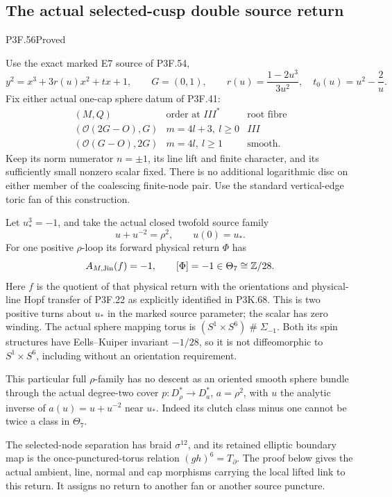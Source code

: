\subsection{The actual selected-cusp double source return}
\begin{statement}{P3F.56}{Proved}

Use the exact marked E7 source of P3F.54,
\[
 y^2=x^3+3r(u)x^2+t x+1,\qquad G=(0,1),\qquad
 r(u)=\frac{1-2u^3}{3u^2},\quad t_0(u)=u^2-\frac2u.
\]
Fix either actual one-cap sphere datum of P3F.41:
\[
 \begin{array}{c|c|c}
 (M,Q)&\text{order at }III^*&\text{root fibre}\\ \hline
 (\mathcal O(2G-O),G)&m=4l+3,\ l\ge0&III\\
 (\mathcal O(G-O),2G)&m=4l,\ l\ge1&\text{smooth}.
 \end{array}
\]
Keep its norm numerator \(n=\pm1\), its line lift and finite character,
and its sufficiently small nonzero scalar fixed. There is no additional
logarithmic disc on either member of the coalescing finite-node pair.
Use the standard vertical-edge toric fan of this construction.

Let \(u_*^3=-1\), and take the actual closed twofold source family
\[
 u+u^{-2}=\rho^2,\qquad u(0)=u_*.
\]
For one positive \(\rho\)-loop its forward physical return \(\Phi\)
has
\[
 A_{M,\rm Jin}(f)=-1,\qquad [\Phi]=-1\in\Theta_7\cong\mathbb Z/28.
\]
Here \(f\) is the quotient of that physical return with the orientations
and physical-line Hopf transfer of P3F.22 as explicitly identified in P3K.68. This is two positive turns about \(u_*\)
in the marked source parameter; the scalar has zero winding.
The actual sphere mapping torus is
\((S^1\times S^6)\mathbin{\#}\Sigma_{-1}\). Both its spin structures
have Eells--Kuiper invariant \(-1/28\), so it is not diffeomorphic to
\(S^1\times S^6\), including without an orientation requirement.

This particular full \(\rho\)-family has no descent as an oriented
smooth sphere bundle through the actual degree-two cover
\(p:D_\rho^*\to D_a^*\), \(a=\rho^2\), with \(u\) the analytic
inverse of \(a(u)=u+u^{-2}\) near \(u_*\). Indeed its clutch class
minus one cannot be twice a class in \(\Theta_7\).

The selected-node separation has braid \(\sigma^{12}\), and its
retained elliptic boundary map is the once-punctured-torus relation
\((gh)^6=T_{\partial}\). The proof below gives the actual ambient,
line, normal and cap morphisms carrying the local lifted link to this
return. It assigns no return to another fan or another source puncture.

\end{statement}
